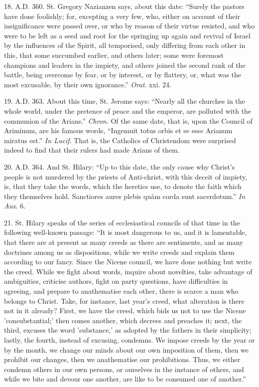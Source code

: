 18. A.D.
360. St. Gregory Nazianzen says, about this date: ``Surely the pastors
have done foolishly; for, excepting a very few, who, either on account
of their insignificance were passed over, or who by reason of their
virtue resisted, and who were to be left as a seed and root for the
springing up again and revival of Israel by the influences of the
Spirit, all temporised, only differing from each other in this, that
some succumbed earlier, and others later; some were foremost champions
and leaders in the impiety, and others joined the second rank of
the battle, being overcome by fear, or by interest, or by flattery, or,
what was the most excusable, by their own ignorance.'' \emph{Orat}. xxi.
24.

19. A.D.
363. About this time, St. Jerome says: ``Nearly all the churches in the
whole world, under the pretence of peace and the emperor, are polluted
with the communion of the Arians.'' \emph{Chron}. Of the same date, that
is, upon the Council of Ariminum, are his famous words, ``Ingemuit totus
orbis et se esse Arianum miratus est.'' \emph{In Lucif}. That is, the
Catholics of Christendom were surprised indeed to find that their rulers
had made Arians of them.

20. A.D.
364. And St. Hilary: ``Up to this date, the only cause why Christ's
people is not murdered by the priests of Anti-christ, with this deceit
of impiety, is, that they take the words, which the heretics use, to
denote the faith which they themselves hold. Sanctiores aures plebis quàm
corda sunt sacerdotum.'' \emph{In Aux}. 6.

21. St. Hilary speaks of the series of
ecclesiastical councils of that time in the following well-known
passage: ``It is most dangerous to us, and it is lamentable, that there
are at present as many creeds as there are sentiments, and as many
doctrines among us as dispositions, while we write creeds and explain
them according to our fancy. Since the Nicene council, we have done
nothing but write the creed. While we fight about words, inquire about
novelties, take advantage of ambiguities, criticise authors, fight on
party questions, have difficulties in agreeing, and prepare to
anathematise each other, there is scarce a man who belongs to Christ.
Take, for instance, last year's creed, what alteration is there not in
it already? First, we have the creed, which bids us not to use the
Nicene 'consubstantial;' then comes another, which decrees and preaches
it; next, the third, excuses the word 'substance,' as adopted by the
fathers in their simplicity; lastly, the fourth, instead of excusing,
condemns. We impose creeds by the year or by the month, we change our
minds about our own imposition of them, then we prohibit our changes,
then we anathematise our prohibitions. Thus, we either condemn others in
our own persons, or ourselves in the instance of others, and while we
bite and devour one another, are like to be consumed one of another.''

